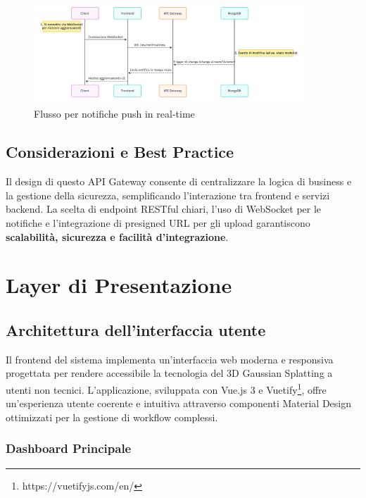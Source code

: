 \begin{figure}[ht]
	\centering
	\includegraphics[width=0.9\textwidth]{images/push_notification_flow.jpg}
	\caption{Flusso per notifiche push in real-time}
	\label{fig:push_notification}
\end{figure}
\subsection{Considerazioni e Best Practice}

Il design di questo API Gateway consente di centralizzare la logica di business e la gestione della sicurezza, semplificando l’interazione tra frontend e servizi backend. La scelta di endpoint RESTful chiari, l’uso di WebSocket per le notifiche e l’integrazione di presigned URL per gli upload garantiscono \textbf{scalabilità, sicurezza e facilità d’integrazione}.


		


\section{Layer di Presentazione}

\subsection{Architettura dell'interfaccia utente}

Il frontend del sistema implementa un'interfaccia web moderna e responsiva progettata per rendere accessibile la tecnologia del 3D Gaussian Splatting a utenti non tecnici. L'applicazione, sviluppata con Vue.js 3 e Vuetify\footnote{https://vuetifyjs.com/en/}, offre un'esperienza utente coerente e intuitiva attraverso componenti Material Design ottimizzati per la gestione di workflow complessi.

\subsubsection{Dashboard Principale}

